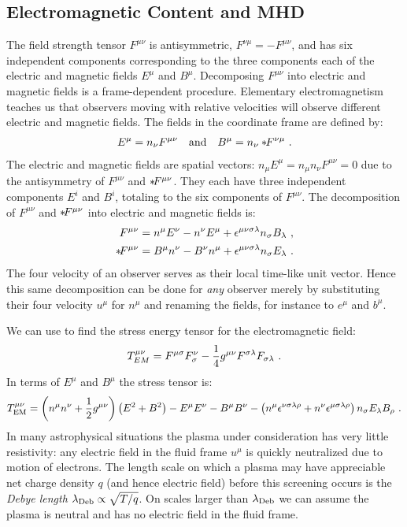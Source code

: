 \subsection{Electromagnetic Content and MHD}

The field strength tensor $F^{\mu\nu}$ is antisymmetric, $F^{\nu\mu} = -F^{\mu\nu}$, and has six independent components corresponding to the three components each of the electric and magnetic fields $E^\mu$ and $B^\mu$.  Decomposing $F^{\mu\nu}$ into electric and magnetic fields is a frame-dependent procedure.  Elementary electromagnetism teaches us that observers moving with relative velocities will observe different electric and magnetic fields.  The fields in the coordinate frame are defined by:
\begin{align}
	E^\mu = n_\nu F^{\mu\nu} \quad \text{and} \quad B^\mu = n_\nu \dual{F}^{\nu\mu}\ . \eqlabel{defEB}
\end{align}
The electric and magnetic fields are spatial vectors: $n_\mu E^\mu = n_\mu n_\nu F^{\mu\nu} = 0$ due to the antisymmetry of $F^{\mu\nu}$ and $*\! F^{\mu\nu}$. They each have three independent components $E^i$ and $B^i$, totaling to the six components of $F^{\mu\nu}$.  The decomposition of $F^{\mu\nu}$ and $*\! F^{\mu\nu}$ into electric and magnetic fields is:
\begin{align}
	F^{\mu\nu} &= n^\mu E^\nu - n^\nu E^\mu + \eps^{\mu\nu\sigma\lambda}n_\sigma B_\lambda\ , \eqlabel{FEB}\\
	\dualt{F}^{\mu\nu} &= B^\mu n^\nu - B^\nu n^\mu + \eps^{\mu\nu\sigma\lambda}n_\sigma E_\lambda\ .
\end{align}
The four velocity of an observer serves as their local time-like unit vector.  Hence this same decomposition can be done for \emph{any} observer merely by substituting their four velocity $u^\mu$ for $n^\mu$ and renaming the fields, for instance to $e^\mu$ and $b^\mu$.

  We can use  to find the stress energy tensor for the electromagnetic field:
  \begin{equation}
  	T^{\mu\nu}_{EM} = F^{\mu\sigma} F^\nu_\sigma - \frac{1}{4}g^{\mu\nu}F^{\sigma \lambda}F_{\sigma\lambda}\ . \eqlabel{TEMF}
  \end{equation}
  In terms of $E^\mu$ and $B^\mu$ the stress tensor is:
  \begin{equation}
  	T^{\mu\nu}_{\text{EM}} = \left(n^\mu n^\nu + \frac{1}{2}g^{\mu\nu}\right)\left(E^2 + B^2\right) - E^\mu E^\nu - B^\mu B^\nu - \left(n^\mu \eps^{\nu \sigma \lambda \rho} + n^{\nu}\eps^{\mu \sigma \lam \rho}\right)n_\sig E_\lam B_\rho\ . \eqlabel{TEMEB}
  \end{equation}
  In many astrophysical situations the plasma under consideration has very little resistivity: any electric field in the fluid frame $u^\mu$ is quickly neutralized due to motion of electrons.  The length scale on which a plasma may have appreciable net charge density $q$ (and hence electric field) before this screening occurs is the \emph{Debye length} $\lambda_{\text{Deb}} \propto \sqrt{T/q}$.  On scales larger than $\lambda_{\text{Deb}}$ we can assume the plasma is neutral and has no electric field in the fluid frame.
  
